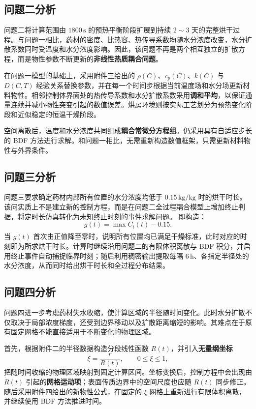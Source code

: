 \documentclass[12pt,a4paper,fontset=none]{ctexart}
\begin{document}
\subsection{问题二分析}

问题二将计算范围由 $1800\,\mathrm{s}$ 的预热平衡阶段扩展到持续 $2\sim3$ 天的完整烘干过程。与问题一相比，药材的密度、比热容、热传导系数均随水分浓度改变，水分扩散系数同时受温度和水分浓度影响。因此，该问题不再是两个相互独立的扩散方程，而是物性参数不断更新的\textbf{非线性热质耦合问题}。

在问题一模型的基础上，采用附件三给出的 $\rho(C)$、$c_p(C)$、$k(C)$ 与 $D(C,T)$ 经验关系替换参数，并在每一个时间步根据当前温度场和水分场更新材料物性。相邻控制体界面处的热传导系数和水分扩散系数采用\textbf{调和平均}，以保证通量连续并减小物性突变引起的数值误差。烘房环境则按实际工艺划分为预热变化阶段和近似稳定的恒温干燥阶段。

空间离散后，温度和水分浓度共同组成\textbf{耦合常微分方程组}。仍采用具有自适应步长的 BDF 方法进行求解。和问题一相比，无需重新构造数值框架，只需更新材料物性与外界条件。

\subsection{问题三分析}

问题三要求确定药材内部所有位置的水分浓度均低于 $0.15\,\mathrm{kg/kg}$ 时的烘干时长。该问实质上不是建立新的控制方程，而是在问题二全过程耦合模型上增加终止判据，将定时长仿真转化为未知终止时刻的事件求解问题。
   即构造：
\begin{equation}
 g(t)=\max_i C_i(t)-0.15.
\end{equation}
当 $g(t)$ 首次由正值降至零时，说明所有位置均已满足干燥标准，此时对应的时刻即为所求烘干时长。计算时继续沿用问题二的有限体积离散与 BDF 积分，并启用终止事件自动捕捉临界时刻；随后利用稠密输出提取每隔 $6\,\mathrm{h}$、各指定半径处的水分浓度，从而同时给出烘干时长和全过程分布结果。

\subsection{问题四分析}

问题四进一步考虑药材失水收缩，使计算区域的半径随时间变化。此时水分扩散不仅取决于局部浓度梯度，还受到边界移动以及扩散距离缩短的影响。其难点在于原有固定网格不能直接适用于不断变化的物理区域。

首先，根据附件二的半径数据构造分段线性函数 $R(t)$，并引入\textbf{无量纲坐标}
\begin{equation}
 \xi=\frac{r}{R(t)},\qquad 0\leq \xi\leq 1,
\end{equation}
把随时间收缩的物理区域映射到固定计算区间。坐标变换后，控制方程中会出现由 $\dot R(t)$ 引起的\textbf{网格运动项}；表面传质边界中的空间尺度也应随 $R(t)$ 同步修正。随后采用附件四给出的新物性公式，在固定的 $\xi$ 网格上重新进行有限体积离散，并继续使用 BDF 方法推进时间。
\end{document}
